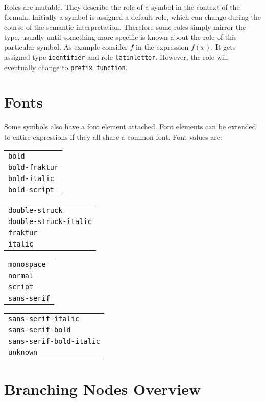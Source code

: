 \documentclass{article}
\begin{document}
Roles are mutable. They describe the role of a symbol in the context of the
formula. Initially a symbol is assigned a default role, which can change during
the course of the semantic interpretation.  Therefore some roles simply mirror
the type, usually until something more specific is known about the role of this
particular symbol. As example consider $f$ in the expression $f(x)$. It gets
assigned type \texttt{identifier} and role \texttt{latinletter}. However, the
role will eventually change to \texttt{prefix function}.




\section{Fonts}
\label{sec:fonts}

Some symbols also have a font element attached. Font elements can be extended to
entire expressions if they all share a common font. Font values are:\vspace*{.5cm}

\noindent
\begin{tabular}{>{\tt}l}
  bold\\
  bold-fraktur\\
  bold-italic\\
  bold-script
\end{tabular}\quad
\begin{tabular}{>{\tt}l}
  double-struck\\
  double-struck-italic\\
  fraktur\\
  italic\\
\end{tabular}\quad
\begin{tabular}{>{\tt}l}
  monospace\\
  normal\\
  script\\
  sans-serif\\
\end{tabular}\quad
\begin{tabular}{>{\tt}l}
  sans-serif-italic\\
  sans-serif-bold\\
  sans-serif-bold-italic\\
  unknown
\end{tabular}

\section{Branching Nodes Overview}
\label{sec:branching-nodes-overview}
\end{document}
